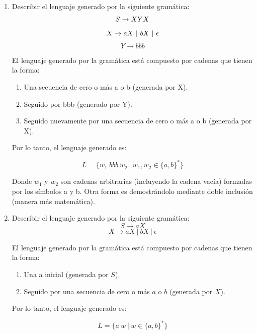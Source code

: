 \documentclass[12pt]{report} %
\begin{document}
\begin{enumerate}
\def\labelenumi{\alph{enumi})}
\item
  Describir el lenguaje generado por la siguiente gramática: \[
   S \to XYX \\
   \] \[
   X \to aX \ | \ bX \ | \ \epsilon \\
   \] \[
   Y \to bbb
   \]

  \begin{solucion}[Ejercicio 1.a]

   El lenguaje generado por la gramática está compuesto por cadenas que tienen la forma:

   \begin{enumerate}
       \item Una secuencia de cero o más a o b (generada por X).
       \item Seguido por bbb (generado por Y).
       \item Seguido nuevamente por una secuencia de cero o más a o b (generada por X).
   \end{enumerate}

   Por lo tanto, el lenguaje generado es:

   $$
   L = \{ w_1 \ bbb \ w_2 \ | \ w_1, w_2 \in \{a, b\}^* \}
   $$

   Donde $w_1$ y $w_2$ son cadenas arbitrarias (incluyendo la cadena vacía) formadas por los símbolos a y b. Otra forma es demostrándolo mediante doble inclusión (manera más matemática).

   \end{solucion}
\item
  Describir el lenguaje generado por la siguiente gramática: \[
   S \to aX 
   \] \[
   X \to aX \ | \ bX \ | \ \epsilon
   \]

  \begin{solucion}[Ejercicio 1.b]

   El lenguaje generado por la gramática está compuesto por cadenas que tienen la forma:

   \begin{enumerate}
       \item Una a inicial (generada por $S$).
       \item Seguido por una secuencia de cero o más $a$ o $b$ (generada por $X$).
   \end{enumerate}

   Por lo tanto, el lenguaje generado es:

   $$
   L = \{ a \ w \ | \ w \in \{a, b\}^* \}
   $$


\end{solucion}
\end{enumerate}
\end{document}
